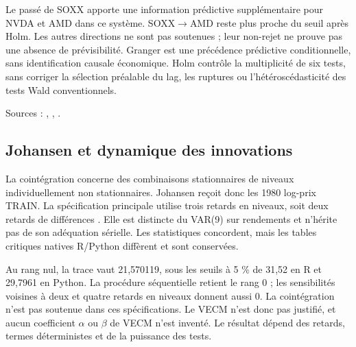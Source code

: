



Le passé de SOXX apporte une information prédictive supplémentaire pour NVDA et AMD dans ce système. SOXX\(\rightarrow\)AMD reste plus proche du seuil après Holm. Les autres directions ne sont pas soutenues ; leur non-rejet ne prouve pas une absence de prévisibilité. Granger est une précédence prédictive conditionnelle, sans identification causale économique. Holm contrôle la multiplicité de six tests, sans corriger la sélection préalable du lag, les ruptures ou l’hétéroscédasticité des tests Wald conventionnels.



Sources : , , .





\subsection{Johansen et dynamique des innovations}



La cointégration concerne des combinaisons stationnaires de niveaux individuellement non stationnaires. Johansen reçoit donc les 1980 log-prix TRAIN. La spécification principale utilise trois retards en niveaux, soit deux retards de différences \cite{R8}. Elle est distincte du VAR(9) sur rendements et n’hérite pas de son adéquation sérielle. Les statistiques concordent, mais les tables critiques natives R/Python diffèrent et sont conservées.



Au rang nul, la trace vaut 21,570119, sous les seuils à 5 \% de 31,52 en R et 29,7961 en Python. La procédure séquentielle retient le rang 0 ; les sensibilités voisines à deux et quatre retards en niveaux donnent aussi 0. La cointégration n’est pas soutenue dans ces spécifications. Le VECM n’est donc pas justifié, et aucun coefficient \(\alpha\) ou \(\beta\) de VECM n’est inventé. Le résultat dépend des retards, termes déterministes et de la puissance des tests.






